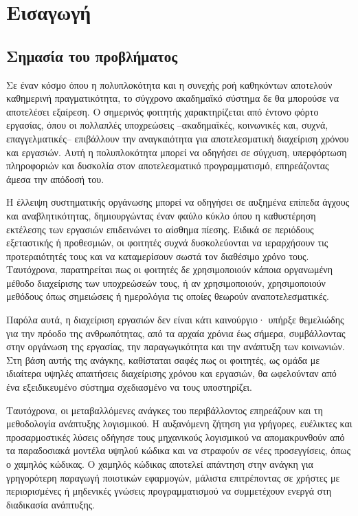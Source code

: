 \chapter{Εισαγωγή}
	\section{Σημασία του προβλήματος}
		Σε έναν κόσμο όπου η πολυπλοκότητα και η συνεχής ροή καθηκόντων αποτελούν καθημερινή πραγματικότητα, το σύγχρονο ακαδημαϊκό σύστημα δε θα μπορούσε να αποτελέσει εξαίρεση. Ο σημερινός φοιτητής χαρακτηρίζεται από έντονο φόρτο εργασίας, όπου οι πολλαπλές υποχρεώσεις --ακαδημαϊκές, κοινωνικές και, συχνά, επαγγελματικές-- επιβάλλουν την αναγκαιότητα για αποτελεσματική διαχείριση χρόνου και εργασιών. Αυτή η πολυπλοκότητα μπορεί να οδηγήσει σε σύγχυση, υπερφόρτωση πληροφοριών και δυσκολία στον αποτελεσματικό προγραμματισμό, επηρεάζοντας άμεσα την απόδοσή του.

		Η έλλειψη συστηματικής οργάνωσης μπορεί να οδηγήσει σε αυξημένα επίπεδα άγχους και αναβλητικότητας, δημιουργώντας έναν φαύλο κύκλο όπου η καθυστέρηση εκτέλεσης των εργασιών επιδεινώνει το αίσθημα πίεσης. Ειδικά σε περιόδους εξεταστικής ή προθεσμιών, οι φοιτητές συχνά δυσκολεύονται να ιεραρχήσουν τις προτεραιότητές τους και να καταμερίσουν σωστά τον διαθέσιμο χρόνο τους. Ταυτόχρονα, παρατηρείται πως οι φοιτητές δε χρησιμοποιούν κάποια οργανωμένη μέθοδο διαχείρισης των υποχρεώσεών τους, ή αν χρησιμοποιούν, χρησιμοποιούν μεθόδους όπως σημειώσεις ή ημερολόγια τις οποίες θεωρούν αναποτελεσματικές.

		Παρόλα αυτά, η διαχείριση εργασιών δεν είναι κάτι καινούργιο· υπήρξε θεμελιώδης για την πρόοδο της ανθρωπότητας, από τα αρχαία χρόνια έως σήμερα, συμβάλλοντας στην οργάνωση της εργασίας, την παραγωγικότητα και την ανάπτυξη των κοινωνιών. Στη βάση αυτής της ανάγκης, καθίσταται σαφές πως οι φοιτητές, ως ομάδα με ιδιαίτερα υψηλές απαιτήσεις διαχείρισης χρόνου και εργασιών, θα ωφελούνταν από ένα εξειδικευμένο σύστημα σχεδιασμένο να τους υποστηρίζει.

		Ταυτόχρονα, οι μεταβαλλόμενες ανάγκες του περιβάλλοντος επηρεάζουν και τη μεθοδολογία ανάπτυξης λογισμικού. Η αυξανόμενη ζήτηση για γρήγορες, ευέλικτες και προσαρμοστικές λύσεις οδήγησε τους μηχανικούς λογισμικού να απομακρυνθούν από τα παραδοσιακά μοντέλα υψηλού κώδικα και να στραφούν σε νέες προσεγγίσεις, όπως ο χαμηλός κώδικας. Ο χαμηλός κώδικας αποτελεί απάντηση στην ανάγκη για γρηγορότερη παραγωγή ποιοτικών εφαρμογών, μάλιστα επιτρέποντας σε χρήστες με περιορισμένες ή μηδενικές γνώσεις προγραμματισμού να συμμετέχουν ενεργά στη διαδικασία ανάπτυξης.


